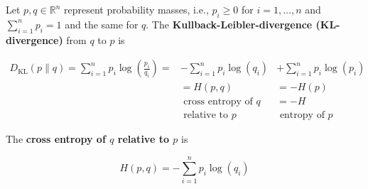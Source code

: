 \documentclass{report}
\begin{document}
\begin{definition}
    Let $p, q \in \mathbb{R}^{n}$ represent probability masses, i.e., $p_{i} \geq 0$ for $i=1, \ldots, n$ and $\sum_{i=1}^{n} p_{i}=1$ and the same for $q$.
    The \textbf{Kullback-Leibler-divergence (KL-divergence)} from $q$ to $p$ is

    $$
    \begin{array}{ll}
    D_{\mathrm{KL}}(p \| q)=\displaystyle \sum_{i=1}^{n} p_{i} \log \left(\frac{p_{i}}{q_{i}}\right)= & -\displaystyle \sum_{i=1}^{n} p_{i} \log \left(q_{i}\right) & +\displaystyle \sum_{i=1}^{n} p_{i} \log \left(p_{i}\right) \\
    & =H(p, q) & =-H(p) \\
    & \text { cross entropy of } q & =-H \\
    & \text { relative to } p & \text { entropy of } p
    \end{array}
    $$

    The \textbf{cross entropy of $q$ relative to $p$} is

    $$
    H(p, q) = -\sum_{i=1}^{n} p_{i} \log \left(q_{i}\right)
    $$
\end{definition}
\end{document}

